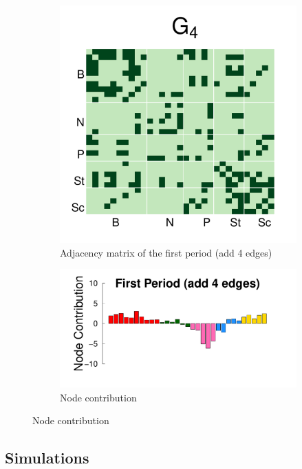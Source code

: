 \documentclass[12pt]{article}
\begin{document}
\begin{figure}[H]
	\centering
	\begin{subfigure}[b]{0.3\textwidth}
		\includegraphics[width=\textwidth]{../Figure/sim_Adj4.pdf}
		\caption{Adjacency matrix of the first period (add 4 edges)}
		\label{fig:step4}
	\end{subfigure}
	\begin{subfigure}[b]{0.6\textwidth}
		\includegraphics[width=\textwidth]{../Figure/step4.pdf}
		\caption{Node contribution}
		\label{fig:adj.step4}
	\end{subfigure}
\end{figure}

\subsection*{Simulations}
\end{document}
